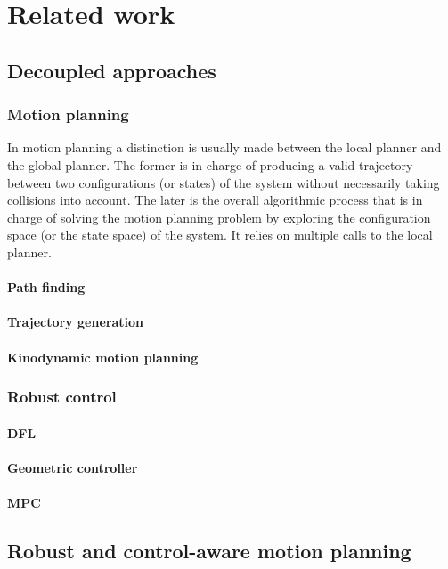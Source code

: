 \chapter{Related work}\label{chap:related_work}

\section{Decoupled approaches}
\subsection{Motion planning}
In motion planning a distinction is usually made between the local planner and the global planner. 
The former is in charge of producing a valid trajectory between two configurations (or states) of the system without necessarily taking collisions into account. 
The later is the overall algorithmic process that is in charge of solving the motion planning problem by exploring the configuration space (or the state space) of the system. 
It relies on multiple calls to the local planner.
\subsubsection{Path finding}
\subsubsection{Trajectory generation}
\subsubsection{Kinodynamic motion planning}
\subsection{Robust control}
\subsubsection{DFL}
\subsubsection{Geometric controller}
\subsubsection{MPC}

\section{Robust and control-aware motion planning}
